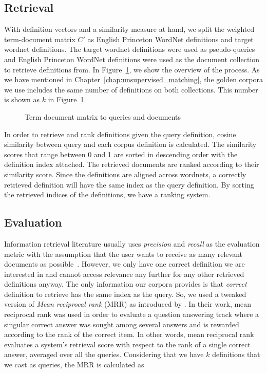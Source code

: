 \subsection{Retrieval}%
\label{sub:retrieval}

With definition vectors and a similarity measure at hand, we split the \tfidf{} weighted term-document matrix $C'$ as English Princeton WordNet definitions and target wordnet definitions.
The target wordnet definitions were used as pseudo-queries and English Princeton WordNet definitions were used as the document collection to retrieve definitions from.
In Figure~\ref{fig:term_document}, we show the overview of the process.
As we have mentioned in Chapter~\ref{chap:unsupervised_matching}, the golden corpora we use includes the same number of definitions on both collections.
This number is shown as $k$ in Figure~\ref{fig:term_document}.

\begin{figure}[htbp]
    \centering
    \caption{Term document matrix to queries and documents}%
    \label{fig:term_document}
\end{figure}

In order to retrieve and rank definitions given the query definition, cosine similarity between query and each corpus definition is calculated.
The similarity scores that range between 0 and 1 are sorted in descending order with the definition index attached.
The retrieved documents are ranked according to their similarity score.
Since the definitions are aligned across wordnets, a correctly retrieved definition will have the same index as the query definition.
By sorting the retrieved indices of the definitions, we have a ranking system.

\subsection{Evaluation}%
\label{sub:monolingual_evaluation}

Information retrieval literature usually uses \emph{precision} and \emph{recall} as the evaluation metric with the assumption that the user wants to receive as many relevant documents as possible~\cite{salton_state_1992}.
However, we only have one correct definition we are interested in and cannot access relevance any further for any other retrieved definitions anyway.
The only information our corpora provides is that \emph{correct} definition to retrieve has the same index as the query.
So, we used a tweaked version of \emph{Mean reciprocal rank} (MRR) as introduced by \textcite{voorhees_trec-8_1999}.
In their work, mean reciprocal rank was used in order to evaluate a question answering track where a singular correct answer was sought among several answers and is rewarded according to the rank of the correct item.
In other words, mean reciprocal rank evaluates a system's retrieval score with respect to the rank of a single correct answer, averaged over all the queries.
Considering that we have $k$ definitions that we cast as queries, the MRR is calculated as

